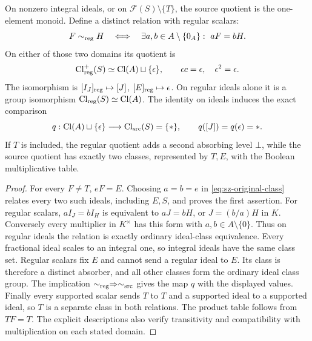 \begin{theorem}\label{thm:sz-class-comparison}
On nonzero integral ideals, or on \(\mathcal F(S)\setminus\{T\}\),
the source quotient is the one-element monoid.
Define a distinct relation with regular scalars:
\begin{equation}\label{eq:sz-regular-class}
 F\sim_{\rm reg}H\quad\Longleftrightarrow\quad
 \exists a,b\in A\setminus\{0_A\}:\ aF=bH .
\end{equation}
On either of those two domains its quotient is
\begin{equation}\label{eq:sz-regular-class-monoid}
 \mathrm{Cl}_{\rm reg}^{+}(S)\simeq\mathrm{Cl}(A)\sqcup\{\epsilon\},
 \qquad \epsilon c=\epsilon,\quad\epsilon^2=\epsilon.
\end{equation}
The isomorphism is \([I_J]_{\rm reg}\mapsto[J]\),
\([E]_{\rm reg}\mapsto\epsilon\).
On regular ideals alone it is a group isomorphism
\(\mathrm{Cl}_{\rm reg}(S)\simeq\mathrm{Cl}(A)\).
The identity on ideals induces the exact comparison
\begin{equation}\label{eq:sz-class-forget}
 q:\mathrm{Cl}(A)\sqcup\{\epsilon\}
 \longrightarrow\mathrm{Cl}_{\rm src}(S)=\{*\},\qquad
 q([J])=q(\epsilon)=* .
\end{equation}
If \(T\) is included, the regular quotient adds a second absorbing
level \(\bot\), while the source quotient has exactly two classes,
represented by \(T,E\), with the Boolean multiplicative table.
\end{theorem}
\begin{proof}
For every \(F\ne T\), \(eF=E\). Choosing \(a=b=e\) in
\eqref{eq:sz-original-class} relates every two such ideals,
including \(E,S\), and proves the first assertion.
For regular scalars, \(aI_J=bI_H\) is equivalent to \(aJ=bH\),
or \(J=(b/a)H\) in \(K\). Conversely every multiplier in \(K^\times\)
has this form with \(a,b\in A\setminus\{0\}\). Thus on regular
ideals the relation is exactly ordinary ideal-class equivalence.
Every fractional ideal scales to an integral one, so integral ideals
have the same class set. Regular scalars fix \(E\) and cannot send
a regular ideal to \(E\). Its class is therefore a distinct
absorber, and all other classes form the ordinary ideal class group.
The implication \(\sim_{\rm reg}\Rightarrow\sim_{\rm src}\) gives
the map \(q\) with the displayed values.
Finally every supported scalar sends \(T\) to \(T\) and a supported
ideal to a supported ideal, so \(T\) is a separate class in both
relations. The product table follows from \(TF=T\).
The explicit descriptions also verify transitivity and compatibility
with multiplication on each stated domain.
\end{proof}


